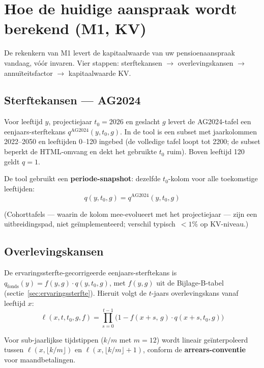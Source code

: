 \documentclass[11pt,a4paper]{article}
\begin{document}
\section{Hoe de huidige aanspraak wordt berekend (M1, KV)}
\label{sec:m1}

De rekenkern van M1 levert de kapitaalwaarde van uw pensioenaanspraak vandaag, vóór invaren. Vier stappen: sterftekansen $\to$ overlevingskansen $\to$ annuïteitsfactor $\to$ kapitaalwaarde KV.

\subsection{Sterftekansen --- AG2024}

Voor leeftijd $y$, projectiejaar $t_0 = 2026$ en geslacht $g$ levert de AG2024-tafel een eenjaars-sterftekans $q^{\text{AG2024}}(y, t_0, g)$. In de tool is een subset met jaarkolommen 2022--2050 en leeftijden 0--120 ingebed (de volledige tafel loopt tot 2200; de subset beperkt de HTML-omvang en dekt het gebruikte $t_0$ ruim). Boven leeftijd 120 geldt $q = 1$.

De tool gebruikt een \textbf{periode-snapshot}: dezelfde $t_0$-kolom voor alle toekomstige leeftijden:
\begin{equation}
q(y, t_0, g) = q^{\text{AG2024}}(y, t_0, g)
\end{equation}

(Cohorttafels --- waarin de kolom mee-evolueert met het projectiejaar --- zijn een uitbreidingspad, niet geïmplementeerd; verschil typisch~$<1\%$ op KV-niveau.)

\subsection{Overlevingskansen}

De ervaringssterfte-gecorrigeerde eenjaars-sterftekans is $q_{\text{fonds}}(y) = f(y, g) \cdot q(y, t_0, g)$, met $f(y,g)$ uit de Bijlage-B-tabel (sectie~\ref{sec:ervaringssterfte}). Hieruit volgt de $t$-jaars overlevingskans vanaf leeftijd $x$:
\begin{equation}
\ell(x, t, t_0, g, f) = \prod_{s=0}^{t-1} \bigl(1 - f(x+s,\,g) \cdot q(x + s, t_0, g)\bigr)
\end{equation}

Voor sub-jaarlijkse tijdstippen ($k/m$ met $m = 12$) wordt lineair geïnterpoleerd tussen $\ell(x, \lfloor k/m \rfloor)$ en $\ell(x, \lfloor k/m \rfloor + 1)$, conform de \textbf{arrears-conventie} voor maandbetalingen.
\end{document}
